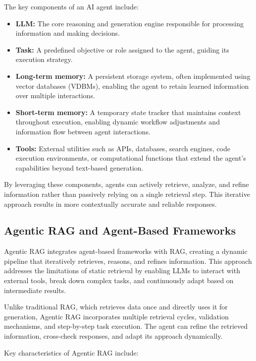 The key components of an AI agent include:

\begin{itemize}
    \item \textbf{LLM:} The core reasoning and generation engine responsible for processing information and making decisions.
    \item \textbf{Task:} A predefined objective or role assigned to the agent, guiding its execution strategy.
    \item \textbf{Long-term memory:} A persistent storage system, often implemented using vector databases (VDBMs), enabling the agent to retain learned information over multiple interactions.
    \item \textbf{Short-term memory:} A temporary state tracker that maintains context throughout execution, enabling dynamic workflow adjustments and information flow between agent interactions.
    \item \textbf{Tools:} External utilities such as APIs, databases, search engines, code execution environments, or computational functions that extend the agent's capabilities beyond text-based generation.
\end{itemize}

By leveraging these components, agents can actively retrieve, analyze, and refine information rather than passively relying on a single retrieval step. This iterative approach results in more contextually accurate and reliable responses.

\subsection{Agentic RAG and Agent-Based Frameworks}

Agentic RAG integrates agent-based frameworks with RAG, creating a dynamic pipeline that iteratively retrieves, reasons, and refines information. This approach addresses the limitations of static retrieval by enabling LLMs to interact with external tools, break down complex tasks, and continuously adapt based on intermediate results.

Unlike traditional RAG, which retrieves data once and directly uses it for generation, Agentic RAG incorporates multiple retrieval cycles, validation mechanisms, and step-by-step task execution. The agent can refine the retrieved information, cross-check responses, and adapt its approach dynamically.

Key characteristics of Agentic RAG include:

